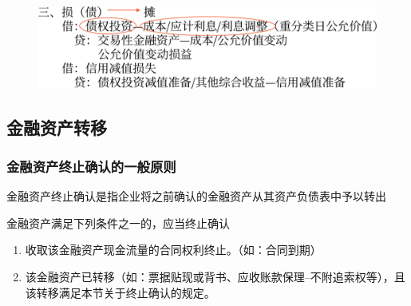 \documentclass[UTF8,12pt]{ctexart}
\numberwithin{equation}{section} %
\numberwithin{figure}{section}
\numberwithin{table}{section}
\begin{document}
	\begin{figure}[h!]
		\centering
		\includegraphics[width=0.7\linewidth]{pic/金融资产重分类5}
		\caption{}
	\end{figure}

	
	\subsection{金融资产转移}
	\subsubsection{金融资产终止确认的一般原则}
	金融资产终止确认是指企业将之前确认的金融资产从其资产负债表中予以转出
	
	金融资产满足下列条件之一的，应当终止确认
	\begin{enumerate}
		\item 收取该金融资产现金流量的合同权利终止。（如：合同到期）
		
		\item 该金融资产已转移（如：票据贴现或背书、应收账款保理--不附追索权等），且该转移满足本节关于终止确认的规定。
	\end{enumerate}
	
\end{document}
